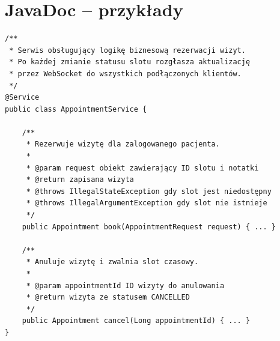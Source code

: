 \documentclass[12pt, a4paper]{article}
\begin{document}
\section{JavaDoc -- przykłady}

\begin{lstlisting}[style=java, caption={JavaDoc -- AppointmentService.java}]
/**
 * Serwis obsługujący logikę biznesową rezerwacji wizyt.
 * Po każdej zmianie statusu slotu rozgłasza aktualizację
 * przez WebSocket do wszystkich podłączonych klientów.
 */
@Service
public class AppointmentService {

    /**
     * Rezerwuje wizytę dla zalogowanego pacjenta.
     *
     * @param request obiekt zawierający ID slotu i notatki
     * @return zapisana wizyta
     * @throws IllegalStateException gdy slot jest niedostępny
     * @throws IllegalArgumentException gdy slot nie istnieje
     */
    public Appointment book(AppointmentRequest request) { ... }

    /**
     * Anuluje wizytę i zwalnia slot czasowy.
     *
     * @param appointmentId ID wizyty do anulowania
     * @return wizyta ze statusem CANCELLED
     */
    public Appointment cancel(Long appointmentId) { ... }
}
\end{lstlisting}
\end{document}
